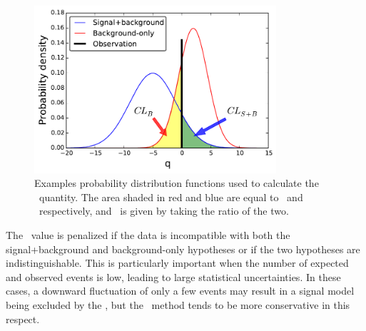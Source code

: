 \begin{figure}
  \centering
  \includegraphics[width=0.80\textwidth]{figs/stats/cls.pdf}
  \caption[
    Examples probability distribution functions used to calculate the
    \cls\ quantity.
  ]{
    Examples probability distribution functions used to calculate the
    \cls\ quantity.
    The area shaded in red and blue are equal to \clb\ and \clsb\ respectively,
    and \cls\ is given by taking the ratio of the two.
  }
  \label{fig:cls}
\end{figure}

The \cls\ value is penalized if the data is incompatible with both the
signal+background and background-only hypotheses or if the two hypotheses are
indistinguishable.
This is particularly important when the number of expected and observed events
is low, leading to large statistical uncertainties.
In these cases, a downward fluctuation of only a few events may result in a
signal model being excluded by the \clsb, but the \cls\ method tends to be
more conservative in this respect.
